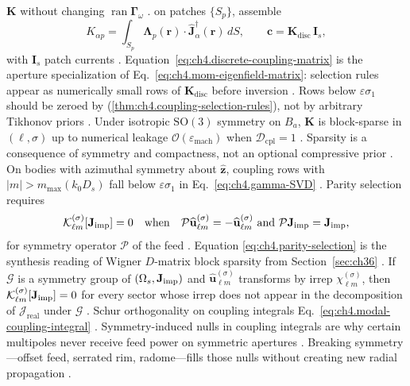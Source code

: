 \(\mathbf{K}\) without changing \(\operatorname{ran}\boldsymbol{\Gamma}_\omega\) \cite{harrington2001}.
on patches \(\{S_{p}\}\), assemble
\begin{equation}
\label{eq:ch4.discrete-coupling-matrix}
K_{\alpha p}
=
\int_{S_{p}}
\boldsymbol{\Lambda}_{p}(\mathbf{r})\cdot
\widehat{\mathbf{J}}_{\alpha}^{\dagger}(\mathbf{r})\,dS,
\qquad
\mathbf{c}
=
\mathbf{K}_{\mathrm{disc}}\,\mathbf{I}_{s},
\end{equation}
with \(\mathbf{I}_{s}\) patch currents \cite{harrington2001}. Equation~\eqref{eq:ch4.discrete-coupling-matrix}
is the aperture specialization of Eq.~\eqref{eq:ch4.mom-eigenfield-matrix}: selection rules appear as numerically
small rows of \(\mathbf{K}_{\mathrm{disc}}\) before inversion \cite{stratton1941}. Rows below
\(\varepsilon\sigma_{1}\) should be zeroed by (\ref{thm:ch4.coupling-selection-rules}), not by arbitrary
Tikhonov priors \cite{harrington2001}.
\label{cor:ch4.sparse-coupling-matrix}
Under isotropic \(\mathrm{SO}(3)\) symmetry on \(B_{a}\), \(\mathbf{K}\) is block-sparse in \((\ell,\sigma)\) up to
numerical leakage \(\mathcal{O}(\varepsilon_{\mathrm{mach}})\) when \(\mathcal{D}_{\mathrm{cpl}}=1\)
\cite{jackson1999}. Sparsity is a consequence of symmetry and compactness, not an optional
compressive prior \cite{devaney2004}.
On bodies with azimuthal symmetry about \(\hat{\mathbf{z}}\), coupling rows with \(|m|>m_{\max}(k_{0}D_{s})\) fall below
\(\varepsilon\sigma_{1}\) in Eq.~\eqref{eq:ch4.gamma-SVD} \cite{jackson1999}. Parity selection
requires
\begin{equation}
\label{eq:ch4.parity-selection}
\mathcal{K}_{\ell m}^{(\sigma)}[\Jimp]=0
\quad\text{when}\quad
\mathcal{P}\widehat{\mathbf{u}}_{\ell m}^{(\sigma)}
=
-\widehat{\mathbf{u}}_{\ell m}^{(\sigma)}
\ \text{and}\ 
\mathcal{P}\Jimp=\Jimp,
\end{equation}
for symmetry operator \(\mathcal{P}\) of the feed \cite{hansen1988}. Equation
\eqref{eq:ch4.parity-selection} is the synthesis reading of Wigner \(D\)-matrix block sparsity from
Section~\ref{sec:ch36} \cite{jackson1999}.
\label{thm:ch4.symmetry-coupling-nulls}
If \(\mathcal{G}\) is a symmetry group of \((\Omega_{s},\mathbf{J}_{\mathrm{imp}})\) and \(\widehat{\mathbf{u}}_{\ell m}^{(\sigma)}\) transforms by
irrep \(\chi_{\ell m}^{(\sigma)}\), then \(\mathcal{K}_{\ell m}^{(\sigma)}[\mathbf{J}_{\mathrm{imp}}]=0\) for every sector whose irrep does not
appear in the decomposition of \(\mathcal{J}_{\mathrm{real}}\) under \(\mathcal{G}\) \cite{hansen1988}.
Schur orthogonality on coupling integrals Eq.~\eqref{eq:ch4.modal-coupling-integral} \cite{jackson1999}.
Symmetry-induced nulls in coupling integrals are why certain multipoles never receive feed power on symmetric apertures \cite{stratton1941}. Breaking symmetry---offset feed, serrated rim, radome---fills those nulls without creating new radial propagation \cite{hansen1988}.
